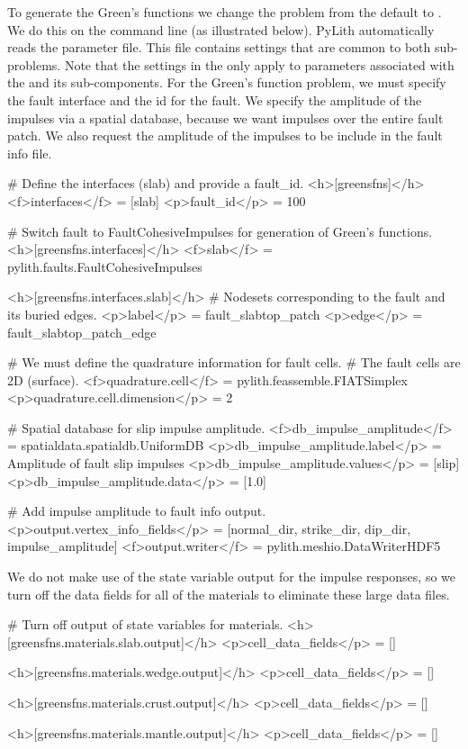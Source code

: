 To generate the Green's functions we change the problem from the
default  to . We do this on
the command line (as illustrated below). PyLith automatically reads
the  parameter file. This file contains
settings that are common to both sub-problems. Note that the settings
in the  only apply to parameters associated
with the  and its sub-components. For the Green's
function problem, we must specify the fault interface and the id for
the fault. We specify the amplitude of the impulses via a
 spatial database, because we want impulses over the
entire fault patch. We also request the amplitude of the impulses to
be include in the fault info file.
\begin{cfg}
# Define the interfaces (slab) and provide a fault_id.
<h>[greensfns]</h>
<f>interfaces</f> = [slab]
<p>fault_id</p> = 100

# Switch fault to FaultCohesiveImpulses for generation of Green's functions.
<h>[greensfns.interfaces]</h>
<f>slab</f> = pylith.faults.FaultCohesiveImpulses

<h>[greensfns.interfaces.slab]</h>
# Nodesets corresponding to the fault and its buried edges.
<p>label</p> = fault_slabtop_patch
<p>edge</p> = fault_slabtop_patch_edge

# We must define the quadrature information for fault cells.
# The fault cells are 2D (surface).
<f>quadrature.cell</f> = pylith.feassemble.FIATSimplex
<p>quadrature.cell.dimension</p> = 2

# Spatial database for slip impulse amplitude.
<f>db_impulse_amplitude</f> = spatialdata.spatialdb.UniformDB
<p>db_impulse_amplitude.label</p> = Amplitude of fault slip impulses
<p>db_impulse_amplitude.values</p> = [slip]
<p>db_impulse_amplitude.data</p> = [1.0]

# Add impulse amplitude to fault info output.
<p>output.vertex_info_fields</p> = [normal_dir, strike_dir, dip_dir, impulse_amplitude]
<f>output.writer</f> = pylith.meshio.DataWriterHDF5
\end{cfg}

We do not make use of the state variable output for the impulse
responses, so we turn off the data fields for all of the
materials to eliminate these large data files.
\begin{cfg}
# Turn off output of state variables for materials.
<h>[greensfns.materials.slab.output]</h>
<p>cell_data_fields</p> = []

<h>[greensfns.materials.wedge.output]</h>
<p>cell_data_fields</p> = []

<h>[greensfns.materials.crust.output]</h>
<p>cell_data_fields</p> = []

<h>[greensfns.materials.mantle.output]</h>
<p>cell_data_fields</p> = []
\end{cfg}

